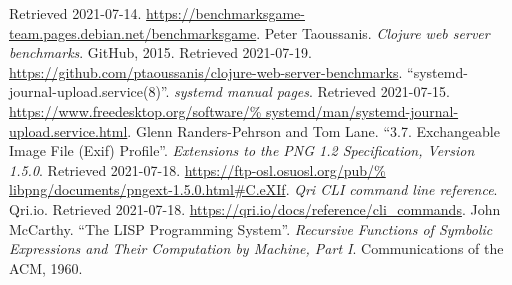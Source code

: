 \begin{thebibliography}{69}
    Retrieved 2021-07-14.
    \url{https://benchmarksgame-team.pages.debian.net/benchmarksgame}.
   Peter Taoussanis.
    \emph{Clojure web server benchmarks}.
    GitHub, 2015.  Retrieved 2021-07-19.
    \url{https://github.com/ptaoussanis/clojure-web-server-benchmarks}.
   ``systemd-journal-upload.service(8)''.
    \emph{systemd manual pages}.  Retrieved 2021-07-15.
    \url{https://www.freedesktop.org/software/%
         systemd/man/systemd-journal-upload.service.html}.
   Glenn Randers-Pehrson and Tom Lane.
    ``3.7. Exchangeable Image File (Exif) Profile''.
    \emph{Extensions to the PNG 1.2 Specification, Version 1.5.0}.
    Retrieved 2021-07-18.  \url{https://ftp-osl.osuosl.org/pub/%
    libpng/documents/pngext-1.5.0.html#C.eXIf}.
   \emph{Qri CLI command line reference}.  Qri.io.
    Retrieved 2021-07-18.  \url{https://qri.io/docs/reference/cli_commands}.
   John McCarthy.
    ``The LISP Programming System''.
    \emph{Recursive Functions of Symbolic Expressions
    and Their Computation by Machine, Part I}.
    Communications of the ACM, 1960.
\end{thebibliography}
